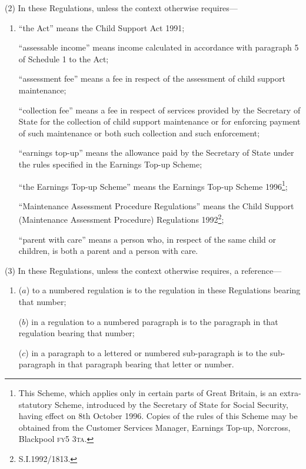 \documentclass[12pt,a4paper]{article}
\begin{document}
(2) In these Regulations, unless the context otherwise requires—
\begin{enumerate}\item[]
“the Act” means the Child Support Act 1991;

“assessable income” means income calculated in accordance with paragraph 5 of Schedule 1 to the Act;

“assessment fee” means a fee in respect of the assessment of child support maintenance;


“collection fee” means a fee in respect of services provided by the Secretary of State for the collection of child support maintenance or for enforcing payment of such maintenance or both such collection and such enforcement;

“earnings top-up” means the allowance paid by the Secretary of State under the rules specified in the Earnings Top-up Scheme;

“the Earnings Top-up Scheme” means the Earnings Top-up Scheme 1996\footnote{\frenchspacing This Scheme, which applies only in certain parts of Great Britain, is an extra-statutory Scheme, introduced by the Secretary of State for Social Security, having effect on 8th October 1996. Copies of the rules of this Scheme may be obtained from the Customer Services Manager, Earnings Top-up, Norcross, Blackpool \textsc{fy5 3ta}.};

“Maintenance Assessment Procedure Regulations” means the Child Support (Maintenance Assessment Procedure) Regulations 1992\footnote{\frenchspacing S.I.1992/1813.};

“parent with care” means a person who, in respect of the same child or children, is both a parent and a person with care.
\end{enumerate}

(3) In these Regulations, unless the context otherwise requires, a reference—
\begin{enumerate}\item[]
($a$) to a numbered regulation is to the regulation in these Regulations bearing that number;

($b$) in a regulation to a numbered paragraph is to the paragraph in that regulation bearing that number;

($c$) in a paragraph to a lettered or numbered sub-paragraph is to the sub-paragraph in that paragraph bearing that letter or number.
\end{enumerate}
\end{document}
